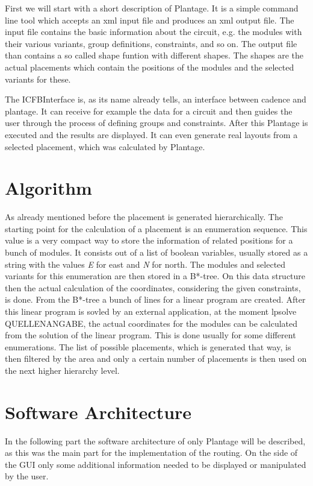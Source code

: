 First we will start with a short description of Plantage. It is a simple command line tool which accepts an xml input file and produces an xml output file. The input file contains the basic information about the circuit, e.g. the modules with their various variants, group definitions, constraints, and so on. The output file than contains a so called shape funtion with different shapes. The shapes are the actual placements which contain the positions of the modules and the selected variants for these.

The ICFBInterface is, as its name already tells, an interface between cadence and plantage. It can receive for example the data for a circuit and then guides the user through the process of defining groups and constraints. After this Plantage is executed and the results are displayed. It can even generate real layouts from a selected placement, which was calculated by Plantage.

\section{Algorithm}
As already mentioned before the placement is generated hierarchically. The starting point for the calculation of a placement is an enumeration sequence. This value is a very compact way to store the information of related positions for a bunch of modules. It consists out of a list of boolean variables, usually stored as a string with the values \textit{E} for east and \textit{N} for north. The modules and selected variants for this enumeration are then stored in a B*-tree. On this data structure then the actual calculation of the coordinates, considering the given constraints, is done. From the B*-tree a bunch of lines for a linear program are created. After this linear program is sovled by an external application, at the moment lpsolve QUELLENANGABE, the actual coordinates for the modules can be calculated from the solution of the linear program. This is done usually for some different enumerations. The list of possible placements, which is generated that way, is then filtered by the area and only a certain number of placements is then used on the next higher hierarchy level.

\section{Software Architecture}
In the following part the software architecture of only Plantage will be described, as this was the main part for the implementation of the routing. On the side of the GUI only some additional information needed to be displayed or manipulated by the user.

